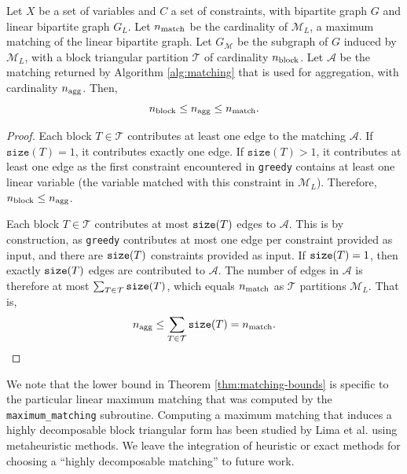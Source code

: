 \documentclass[smallextended]{svjour3}
\newcommand{\rev}[1]{{#1}}
\begin{document}
\begin{theorem}
  Let $X$ be a set of variables and $C$ a set of constraints, with bipartite graph $G$
  and linear bipartite graph $G_L$. Let $n_{\rm match}$ be the cardinality of $\mathcal{M}_L$,
  a maximum matching of the linear bipartite graph. Let $G_\mathcal{M}$ be the subgraph
  of $G$ induced by $\mathcal{M}_L$, with a block triangular partition $\mathcal{T}$
  of cardinality $n_{\rm block}$. Let $\mathcal{A}$ be the matching returned by Algorithm
  \ref{alg:matching} that is used for aggregation, with cardinality $n_{\rm agg}$.
  Then\rev{,}
  \[n_{\rm block} \leq n_{\rm agg} \leq n_{\rm match}\rev{.}\]
  \label{thm:matching-bounds}
\end{theorem}
\begin{proof}
  Each block $T\in \mathcal{T}$ contributes at least one edge to the matching $\mathcal{A}$.
  If $\texttt{size}(T)=1$, it contributes exactly one edge. If $\texttt{size}(T) > 1$, it
  contributes at least one edge as the first constraint encountered in
  {\tt greedy} contains at least one linear variable (the variable matched with
  this constraint in $\mathcal{M}_L$).
  Therefore, $n_{\rm block} \leq n_{\rm agg}$.

  Each block $T\in \mathcal{T}$ contributes at most ${\tt size}(T)$ edges to $\mathcal{A}$.
  This is by construction, as {\tt greedy} contributes at most one edge per
  constraint provided as input, and there are ${\tt size}(T)$ constraints provided as
  input. If ${\tt size}(T)=1$, then exactly ${\tt size}(T)$ edges are contributed to
  $\mathcal{A}$. The number of edges in $\mathcal{A}$ is therefore at most 
  $\sum_{T\in \mathcal{T}} {\tt size}(T)$, which equals $n_{\rm match}$ as $\mathcal{T}$
  partitions $\mathcal{M}_L$. That is,
  \[n_{\rm agg} \leq \sum_{T\in \mathcal{T}} {\tt size}(T) = n_{\rm match}\rev{.}\]
\end{proof}

We note that the lower bound in Theorem \ref{thm:matching-bounds} is specific to the
particular linear maximum matching that was computed by the {\tt maximum\_matching}
subroutine. Computing a maximum matching that induces a highly decomposable block
triangular form has been studied by Lima et al. \cite{lima2006} using metaheuristic
methods. We leave the integration of heuristic or exact methods for choosing
a ``highly decomposable matching'' to future work.
\end{document}
